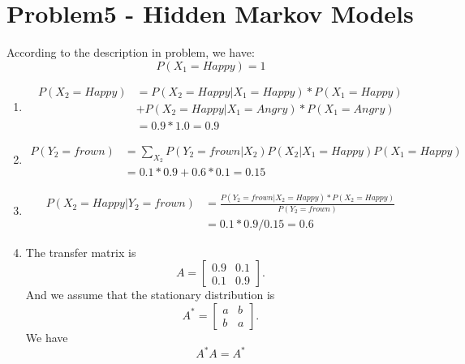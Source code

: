 \documentclass[12pt]{article}
\begin{document}
\section{Problem5 - Hidden Markov Models}
According to the description in problem, we have:
\begin{equation}
	P(X_1 = Happy)=1
\end{equation}
\begin{enumerate}
	\item
	\begin{equation}
		\begin{split}
			P(X_2=Happy) &= P(X_2=Happy | X_1=Happy)*P(X_1=Happy)\\
			&+P(X_2=Happy | X_1=Angry)*P(X_1=Angry) \\
			& = 0.9* 1.0 = 0.9
		\end{split}
	\end{equation}
	\item
	\begin{equation}
		\begin{split}
			P(Y_2=frown) &= \sum_{X_2} P(Y_2=frown | X_2) P(X_2|X_1=Happy) P(X_1=Happy)\\
			&=0.1*0.9 + 0.6*0.1 = 0.15
		\end{split}
	\end{equation}
	\item
	\begin{equation}
		\begin{split}
			P(X_2=Happy | Y_2=frown) &= \frac{P(Y_2=frown|X_2=Happy)*P(X_2=Happy)}{P(Y_2=frown)}\\
			&=0.1*0.9/0.15 = 0.6
		\end{split}
	\end{equation}
	\item
	The transfer matrix is 
	\begin{equation}
		A = \left [ \begin{array}{cc}
			0.9 & 0.1 \\
			0.1 & 0.9 
		\end{array} \right ].
	\end{equation}
	And we assume that the stationary distribution is 
	\begin{equation}
		A^* = \left [ \begin{array}{cc}
			a & b \\
			b & a 
		\end{array} \right ].
	\end{equation}
	We have 
	\begin{equation}
		A^* A = A^*

\end{equation}
\end{enumerate}
\end{document}
